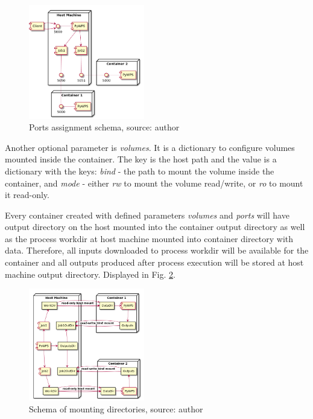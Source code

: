 \documentclass{gifce}
\begin{document}
\begin{figure}[h!]
\centering
\includegraphics[width=0.45\textwidth]{img/Diag_ports.png}
\caption{Ports assignment schema, source: author}
\label{fig:Diag_port}
\end{figure}

Another optional parameter is \textit{volumes}. It is a dictionary 
to configure volumes mounted inside the container. The key is the host path and the value is a dictionary with the keys: \textit{bind}
- the path to mount the volume inside the container, and \textit{mode} - either \textit{rw} to mount the volume read/write, or 
\textit{ro} to mount it read-only.

Every container created with defined parameters \textit{volumes} and
\textit{ports} will have output directory on the host mounted into the
container output directory as well as the process workdir at host
machine mounted into container directory with data. Therefore, all
inputs downloaded to process workdir will be available for the
container and all outputs produced after process execution will be
stored at host machine output directory. Displayed in
Fig. \ref{fig:Diag_mount}.

\begin{figure}[h!]
\centering
\includegraphics[width=0.45\textwidth]{img/Diag_mount.png}
\caption{Schema of mounting directories, source: author}
\label{fig:Diag_mount}
\end{figure}
\end{document}
